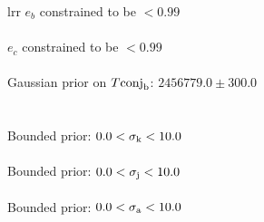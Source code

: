 \documentclass{emulateapj}
\begin{document}
\begin{deluxetable}{lrr}
\tablehead{}
\startdata
$e_{b}$ constrained to be $<0.99$ \\\\
$e_{c}$ constrained to be $<0.99$ \\\\
Gaussian prior on $T\rm{conj}_{b}$: $2456779.0 \pm 300.0$ \\\\\\
Bounded prior: $0.0 < \sigma_{\rm k} < 10.0$\\\\
Bounded prior: $0.0 < \sigma_{\rm j} < 10.0$\\\\
Bounded prior: $0.0 < \sigma_{\rm a} < 10.0$\\\\

\enddata
\end{deluxetable}
\end{document}
